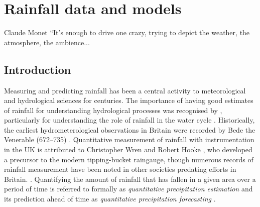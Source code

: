 \chapter{Rainfall data and models}
\label{chapter_metdata}

% 
%
\begin{chapquote}{Claude Monet \textit{}}
``It's enough to drive one crazy, trying to depict the weather, the atmosphere, the ambience...
\end{chapquote}

\section{Introduction}

Measuring and predicting rainfall has been a central activity to meteorological and hydrological sciences for centuries. The importance of having good estimates of rainfall for understanding hydrological processes was recognised by \citet{perrault1674}, particularly for understanding the role of rainfall in the water cycle \citep{biswas1970history}. Historically, the earliest hydrometerological observations in Britain were recorded by Bede the Venerable (672--735) \citep{mcculloch1993history}. Quantitative measurement of rainfall with instrumentation in the UK is attributed to Christopher Wren and Robert Hooke \citep{biswas1970history}, who developed a precursor to the modern tipping-bucket raingauge, though numerous records of rainfall measurement have been noted in other societies predating efforts in Britain. \citep{strangeways2010history}. Quantifying the amount of rainfall that has fallen in a given area over a period of time is referred to formally as \textit{quantitative precipitation estimation} \citep{fabry2015radar} and its prediction ahead of time as \textit{quantitative precipitation forecasting} \citep{golding2000quantitative,browning2003quantitative}.

